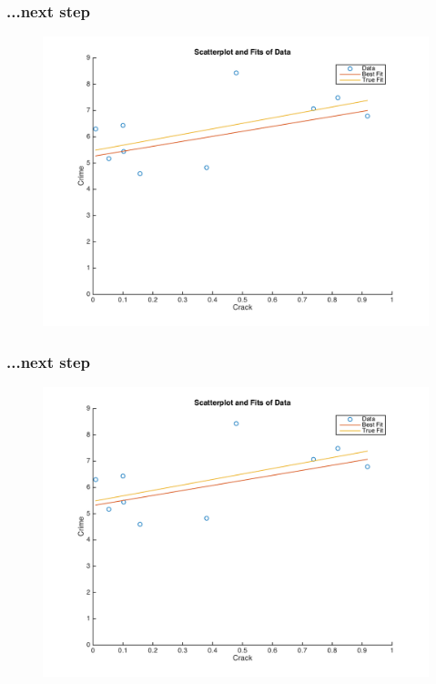 \documentclass{beamer}
\begin{document}
\begin{frame}
\frametitle[alignment=center]{...next step}
\begin{figure}
\centering
\includegraphics[scale=0.5]{Newton_OLS_Figure_14.png}
\end{figure}
\end{frame}

\begin{frame}
\frametitle[alignment=center]{...next step}
\begin{figure}
\centering
\includegraphics[scale=0.5]{Newton_OLS_Figure_15.png}
\end{figure}
\end{frame}
\end{document}
